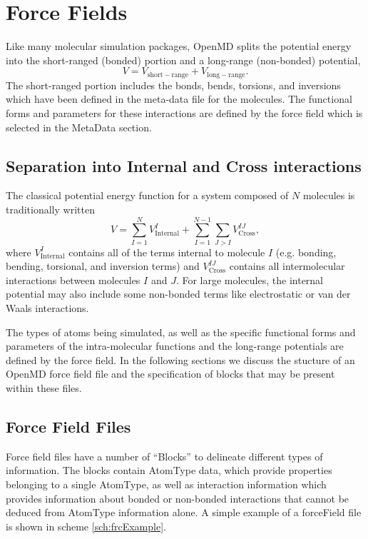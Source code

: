 \documentclass[]{book}
\begin{document}
\chapter{\label{chapter:forceFields}Force Fields}

Like many molecular simulation packages, {\sc OpenMD} splits the
potential energy into the short-ranged (bonded) portion and a
long-range (non-bonded) potential,
\begin{equation}
V = V_{\mathrm{short-range}} + V_{\mathrm{long-range}}.
\end{equation}
The short-ranged portion includes the bonds, bends, torsions, and
inversions which have been defined in the meta-data file for the
molecules.  The functional forms and parameters for these interactions
are defined by the force field which is selected in the MetaData
section.

\section{\label{section:divisionOfLabor}Separation into Internal and
  Cross interactions}

The classical potential energy function for a system composed of $N$
molecules is traditionally written
\begin{equation}
V = \sum^{N}_{I=1} V^{I}_{\text{Internal}}
	+ \sum^{N-1}_{I=1} \sum_{J>I} V^{IJ}_{\text{Cross}},
\label{eq:totalPotential}
\end{equation}
where $V^{I}_{\text{Internal}}$ contains all of the terms internal to
molecule $I$ (e.g. bonding, bending, torsional, and inversion terms)
and $V^{IJ}_{\text{Cross}}$ contains all intermolecular interactions
between molecules $I$ and $J$.  For large molecules, the internal
potential may also include some non-bonded terms like electrostatic or
van der Waals interactions.

The types of atoms being simulated, as well as the specific functional
forms and parameters of the intra-molecular functions and the
long-range potentials are defined by the force field. In the following
sections we discuss the stucture of an OpenMD force field file and the
specification of blocks that may be present within these files.

\section{\label{section:frcFile}Force Field Files}

Force field files have a number of ``Blocks'' to delineate different
types of information.  The blocks contain AtomType data, which provide
properties belonging to a single AtomType, as well as interaction
information which provides information about bonded or non-bonded
interactions that cannot be deduced from AtomType information alone.
A simple example of a forceField file is shown in scheme
\ref{sch:frcExample}.
\end{document}
